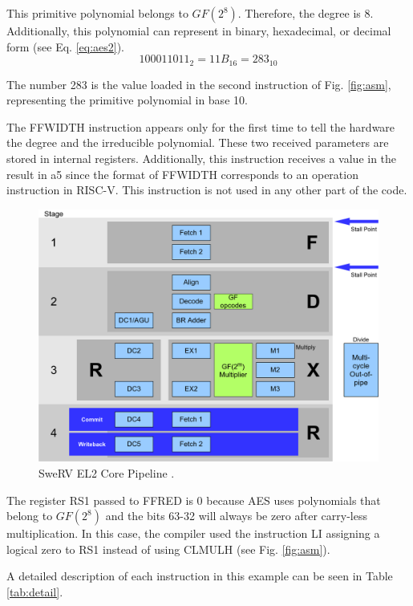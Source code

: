 This primitive polynomial belongs to $GF(2^8)$. Therefore, the degree is 8. Additionally, this polynomial can represent in binary, 
hexadecimal, or decimal form (see Eq. \ref{eq:aes2}). 
\begin{equation}
    100011011_{2}=11B_{16}=283_{10}
    \label{eq:aes2}
\end{equation}


The number 283 is the value loaded in the second instruction of Fig. \ref{fig:asm}, representing the primitive polynomial in base 10.

The FFWIDTH instruction appears only for the first time to tell the hardware 
the degree and the irreducible polynomial. These two received parameters are stored in internal registers. 
Additionally, this instruction receives a value in the result in a5 since the format of FFWIDTH corresponds to an 
operation instruction in RISC-V. This instruction is not used in any other part of the code.


\begin{figure}[b]
    \centering
    \includegraphics[width=0.95\linewidth]{img/swerv.png}
    \caption{SweRV EL2 Core Pipeline \cite{swervel2}.}
    \label{fig:swerv}
\end{figure}

The register RS1 passed to FFRED is 0 because AES uses polynomials that belong to $GF(2^8)$ 
and the bits 63-32 will always be zero after carry-less multiplication. In this case, the compiler used the instruction 
LI assigning a logical zero to RS1 instead of using CLMULH (see Fig. \ref{fig:asm}). 

A detailed description of each instruction in this example can be seen in Table \ref{tab:detail}.



